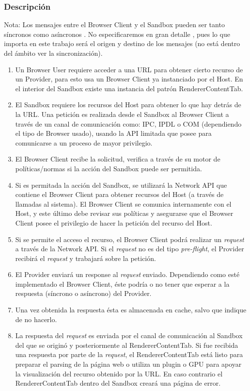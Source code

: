 \subsubsection{Descripción}
Nota: Los mensajes entre el Browser Client y el Sandbox pueden ser tanto síncronos como asíncronos \cite{firefoxIPC,GCIPC}. No especificaremos en gran detalle , pues lo que importa en este trabajo será el origen y destino de los mensajes (no está dentro del ámbito ver la sincronización).
	\begin{enumerate}
		\item Un Browser User requiere acceder a una URL para obtener cierto recurso de un Provider, para esto usa un Browser Client ya instanciado por el Host. En el interior del Sandbox existe una instancia del patrón RendererContentTab. 
		\item El Sandbox requiere los recursos del Host para obtener lo que hay detrás de la URL. Una petición es realizada desde el Sandbox al Browser Client a través de un canal de comunicación como: IPC, IPDL o COM (dependiendo el tipo de Browser usado), usando la API limitada que posee para comunicarse a un proceso de mayor privilegio. 
		\item El Browser Client recibe la solicitud, verifica a través de su motor de políticas/normas si la acción del Sandbox puede ser permitida.
		\item Si es permitada la acción del Sandbox, se utilizará la Network API que contiene el Browser Client para obtener recursos del Host (a través de llamadas al sistema). El Browser Client se comunica internamente con el Host, y este último debe revisar sus políticas y asegurarse que el Browser Client posee el privilegio de hacer la petición del recurso del Host.
		\item Si se permite el acceso el recurso, el Browser Client podrá realizar un \textit{request} a través de la Network API. Si el \textit{request} no es del tipo \textit{pre-flight}, el Provider recibirá el \textit{request} y trabajará sobre la petición.
		\item El Provider enviará un response al \textit{request} enviado. Dependiendo como esté implementado el Browser Client, éste podría o no tener que esperar a la respuesta (síncrono o asíncrono) del Provider.
		\item Una vez obtenida la respuesta ésta es almacenada en cache, salvo que indique de no hacerlo.
		\item La respuesta del \textit{request} es enviada por el canal de comunicación al Sandbox del que se originó y posteriormente al RendererContentTab. Si fue recibida una respuesta por parte de la \textit{request}, el RendererContentTab está listo para preparar el parsing de la página web o utiliza un plugin o GPU para apoyar la visualización del recurso obtenido por la URL. En caso contrario el RendererContentTab dentro del Sandbox creará una página de error.

\end{enumerate}
